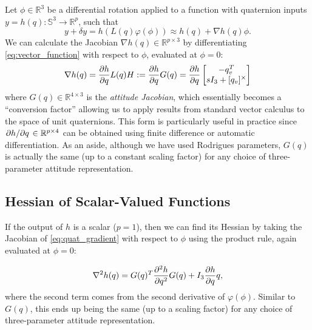 \documentclass[letterpaper, 10 pt, conference]{ieeeconf}  %
\newcommand{\R}{\mathbb{R}}
\newcommand{\Q}{\mathbb{S}^3}
\newcommand{\skewmat}[1]{[#1]^\times}
\begin{document}
        Let $\phi \in \R^3$ be a differential rotation applied to a function with
        quaternion inputs $y = h(q): \Q \to \R^p$, such that
        \begin{equation} \label{eq:vector_function}
            y + \delta y = h(L(q) \varphi(\phi)) \approx h(q) +  \nabla h(q) \phi.
        \end{equation}
        We can calculate the Jacobian $\nabla h(q) \in \R^{p \times 3}$ by
        differentiating \eqref{eq:vector_function} with respect to $\phi$, evaluated at
        $\phi = 0$:
        \begin{equation} \label{eq:quat_gradient}
            \nabla h(q) = \pdv{h}{q} L(q) H := \pdv{h}{q} G(q) 
                        = \pdv{h}{q} \begin{bmatrix} 
                            -q_v^T \\ 
                            sI_3 + \skewmat{q_v}
                        \end{bmatrix}
        \end{equation}
        where $G(q) \in \R^{4 \times 3}$ is the \textit{attitude Jacobian}, which
        essentially becomes a ``conversion factor'' allowing us to apply results from
        standard vector calculus to the space of unit quaternions. This form is
        particularly useful in practice since $\pdv*{h}{q} \in \R^{p \times 4}$ can be
        obtained using finite difference or automatic differentiation.
        As an aside, although we have used Rodrigues parameters, $G(q)$ is actually the
        same (up to a constant scaling factor) for any choice of three-parameter attitude
        representation.

    \subsection{Hessian of Scalar-Valued Functions}
	    If the output of $h$ is a scalar ($p = 1$), then we can find its Hessian by
	    taking the Jacobian of \eqref{eq:quat_gradient} with respect to $\phi$ using the
        product rule, again evaluated at $\phi = 0$:

	    \begin{equation} \label{eq:quat_hessian}
            \nabla^2 h(q) = G(q)^T \pdv[2]{h}{q} G(q) + I_3 \pdv{h}{q}q,
	    \end{equation}
	    where the second term comes from the second derivative of $\varphi(\phi)$.
	    Similar to $G(q)$, this ends up being the same (up to a scaling factor) for any
        choice of three-parameter attitude representation.
        
\end{document}
